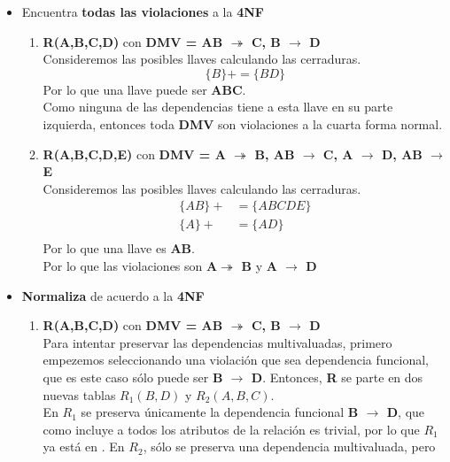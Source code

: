 \documentclass{article}
\begin{document}
\begin{enumerate}
    \begin{itemize}
    	\item Encuentra \textbf{todas las violaciones} a la \textbf{4NF}
    	 \begin{enumerate}
    	     \item \textbf{R(A,B,C,D)} con \textbf{DMV = {AB $\twoheadrightarrow$ C, B $\rightarrow$ D}}\\
    	     Consideremos las posibles llaves calculando las cerraduras.
    	     \[\{B\}+ = \{BD\}\]
    	     Por lo que una llave puede ser \textbf{ABC}.\\
    	     Como ninguna de las dependencias tiene a esta llave en su
    	     parte izquierda, entonces toda \textbf{DMV} son violaciones
    	     a la cuarta
    	     forma normal.
    	     \item  \textbf{R(A,B,C,D,E)} con \textbf{DMV = { A $\twoheadrightarrow$ B, AB $\rightarrow$ C, A $\rightarrow$ D, AB $\rightarrow$ E}} \\
    	     Consideremos las posibles llaves calculando las cerraduras.
    	     \begin{align*}
    	         \{AB\}+ &= \{ABCDE\} \\
    	         \{A\}+ &= \{AD\} \\
    	     \end{align*}
    	     Por lo que una llave es \textbf{AB}.\\
    	     Por lo que las violaciones son 
    	     \textbf{ A$\twoheadrightarrow$ B} y \textbf{A $\rightarrow$ D}
    	 \end{enumerate}
    	\item \textbf{Normaliza} de acuerdo a la \textbf{4NF}
    	\begin{enumerate}
    	    \item \textbf{R(A,B,C,D)} con \textbf{DMV = {AB $\twoheadrightarrow$ C, B $\rightarrow$ D}}\\
    	    Para intentar preservar las dependencias multivaluadas,
    	    primero empezemos seleccionando una violación que sea
    	    dependencia funcional, que es este caso sólo puede ser 
    	    \textbf{B $\rightarrow$ D}.
    	    Entonces, \textbf{R} se parte en dos nuevas tablas
    	    $R_1(B, D)$ y $R_2(A, B, C)$.\\
    	    En $R_1$ se preserva únicamente la dependencia funcional 
    	    \textbf{B $\rightarrow$ D}, que como incluye a todos los
    	    atributos de la relación es trivial, por lo que $R_1$ ya
    	    está en .
    	    En $R_2$, sólo se preserva una dependencia multivaluada, pero

\end{enumerate}
\end{itemize}
\end{enumerate}
\end{document}
